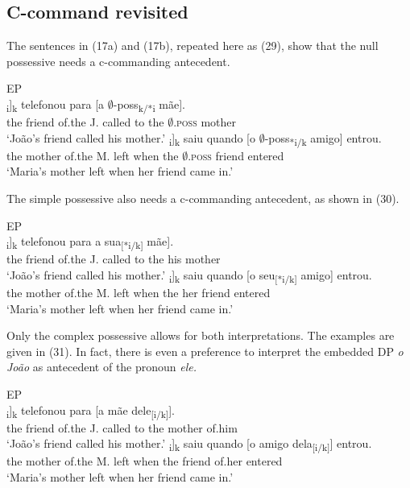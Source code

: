 \documentclass[output=paper]{langsci/langscibook}
\begin{document}
\subsection{C-command revisited}%

The sentences in (17a) and (17b), repeated here as (29), show that the null possessive needs a c-commanding antecedent.

\ea%
    EP\label{ex:wein:29}\\
    \ea
    \gll \relax[O amigo d[o João]\textsubscript{i}]\textsubscript{k} telefonou para [a $\emptyset$-poss\textsubscript{k/*i} mãe].\\
         the friend of.the J. called   to the $\emptyset$\textsc{.poss} mother\\
    \glt ‘João’s friend called his mother.’
    \ex  
    \gll \relax [A mãe d[a Maria]\textsubscript{i}]\textsubscript{k} saiu quando [o $\emptyset$-poss\textsubscript{*i/k} amigo] entrou.\\
         the mother of.the M. left when the $\emptyset$\textsc{.poss} friend entered\\
    \glt ‘Maria’s mother left when her friend came in.’
    \z
\z    


The simple possessive also needs a c-commanding antecedent, as shown in (30).

\ea%
    EP\label{ex:wein:30}\\
    \ea
    \gll \relax[O amigo d[o João]\textsubscript{i}]\textsubscript{k} telefonou para a   sua\textsubscript{[*i/k]} mãe].\\
         the friend of.the J. called   to the his mother\\
    \glt ‘João’s friend called his mother.’
    \ex  
    \gll \relax[A mãe d[a Maria]\textsubscript{i}]\textsubscript{k} saiu quando [o seu\textsubscript{[*i/k]} amigo] entrou.\\
         the mother of.the M. left when the her friend entered\\
    \glt ‘Maria’s mother left when her friend came in.’
    \z
\z

Only the complex possessive allows for both interpretations. The examples are given in (31). In fact, there is even a preference to interpret the embedded DP \textit{o João} as antecedent of the pronoun \textit{ele.}

\ea%
         EP\label{ex:wein:31}\\
    \ea  
    \gll \relax [O amigo d[o João]\textsubscript{i}]\textsubscript{k} telefonou para [a mãe dele\textsubscript{[i/k]}].\\
         the friend of.the J. called to the mother of.him\\
    \glt ‘João’s friend called his mother.’
    \ex  
    \gll \relax [A mãe d[a Maria]\textsubscript{i}]\textsubscript{k} saiu quando [o amigo dela\textsubscript{[i/k]}] entrou.\\
         the mother of.the M. left when the friend of.her entered\\
    \glt ‘Maria’s mother left when her friend came in.’
    \z
\z
\end{document}
